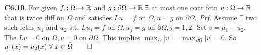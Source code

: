 {\bf C6.10}. For given $f: \Omega \rightarrow \mathbb{R}$ and $g: \partial \Omega \rightarrow \mathbb{R} \; \exists$ at most one cont fctn $u: \bar{\Omega} \rightarrow \mathbb{R}$ that is twice diff on $\Omega$ and satisfies $Lu=f$ on $\Omega, u = g$ on $\partial \Omega$. {\it Prf}. Assume $\exists$ two such fctns $u_1$ and $u_2$ s.t. $Lu_j = f$ on $\Omega, u_j = g$ on $\partial \Omega, j = 1,2$. Set $v = u_1 - u_2$.  The $Lv = 0$ on $\Omega, v=0$ on $\partial \Omega$. This implies $\max_{\bar{\Omega}} |v| = \max_{\partial \Omega} |v| = 0$. So $u_1(x) = u_2(x)\; \forall \; x \in \bar{\Omega} \qed$